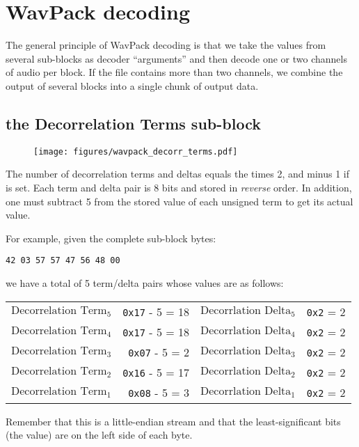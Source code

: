 \clearpage

\section{WavPack decoding}
The general principle of WavPack decoding is that we take the
values from several sub-blocks as decoder ``arguments''
and then decode one or two channels of audio per block.
If the file contains more than two channels, we combine the output
of several blocks into a single chunk of output data.

\subsection{the Decorrelation Terms sub-block}
\label{wavpack_decorr_terms}
\begin{figure}[h]
\texttt{[image: figures/wavpack\_decorr\_terms.pdf]}
\end{figure}
\par
\noindent
The number of decorrelation terms and deltas
equals the  times 2, and minus 1 if
 is set.
Each term and delta pair is 8 bits and stored in \textit{reverse} order.
In addition, one must subtract 5 from the stored value of each
unsigned term to get its actual value.

For example, given the complete sub-block bytes:
\begin{Verbatim}[frame=single]
42 03 57 57 47 56 48 00
\end{Verbatim}
we have a total of 5 term/delta pairs whose values are as follows:
\begin{table}[h]
\begin{tabular}{r r | r r}
$\text{Decorrelation Term}_5$ & \texttt{0x17} - 5 = 18 & $\text{Decorrlation Delta}_5$ & \texttt{0x2} = 2 \\
$\text{Decorrelation Term}_4$ & \texttt{0x17} - 5 = 18 & $\text{Decorrlation Delta}_4$ & \texttt{0x2} = 2 \\
$\text{Decorrelation Term}_3$ & \texttt{0x07} - 5 = 2 & $\text{Decorrlation Delta}_3$ & \texttt{0x2} = 2 \\
$\text{Decorrelation Term}_2$ & \texttt{0x16} - 5 = 17 & $\text{Decorrlation Delta}_2$ & \texttt{0x2} = 2 \\
$\text{Decorrelation Term}_1$ & \texttt{0x08} - 5 = 3 & $\text{Decorrlation Delta}_1$ & \texttt{0x2} = 2 \\
\end{tabular}
\end{table}
\par
\noindent
Remember that this is a little-endian stream and that the least-significant
bits (the  value) are on the left side of each byte.

